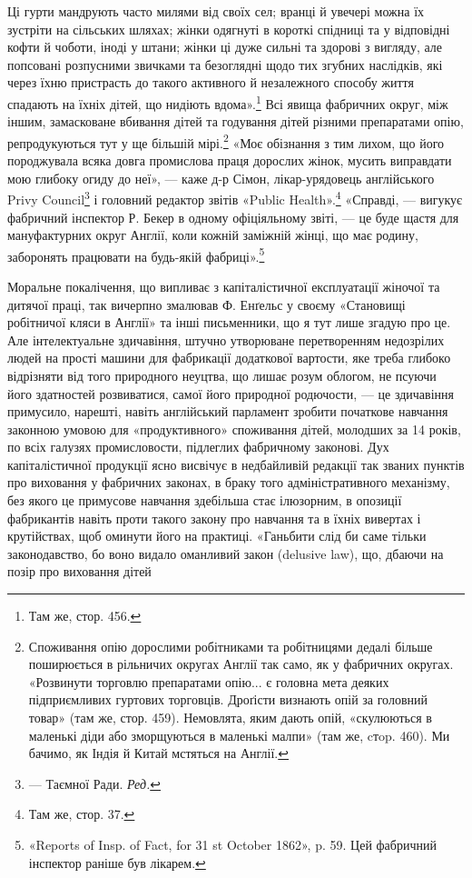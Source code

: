 \parcont{}  %
Ці гурти мандрують часто милями від своїх сел; вранці й увечері
можна їх зустріти на сільських шляхах; жінки одягнуті в короткі
спідниці та у відповідні кофти й чоботи, іноді у штани; жінки ці
дуже сильні та здорові з вигляду, але попсовані розпусними
звичками та безоглядні щодо тих згубних наслідків, які через
їхню пристрасть до такого активного й незалежного способу
життя спадають на їхніх дітей, що нидіють вдома».\footnote{
Там же, стор. 456.
} Всі явища
фабричних округ, між іншим, замасковане вбивання дітей та
годування дітей різними препаратами опію, репродукуються тут
у ще більшій мірі.\footnote{
Споживання опію дорослими робітниками та робітницями дедалі
більше поширюється в рільничих округах Англії так само, як у фабричних
округах. «Розвинути торговлю препаратами опію... є головна мета
деяких підприємливих гуртових торговців. Дроґісти визнають опій за
головний товар» (там же, стор. 459). Немовлята, яким дають опій, «скулюються
в маленькі діди або зморщуються в маленькі малпи» (там же,
cтop. 460). Ми бачимо, як Індія й Китай мстяться на Англії.
} «Моє обізнання з тим лихом, що його породжувала
всяка довга промислова праця дорослих жінок, мусить
виправдати мою глибоку огиду до неї», — каже д-р Сімон,
лікар-урядовець англійського Privy Council\footnote*{
— Таємної Ради. \emph{Ред.}
} і головний редактор
звітів «Public Health».\footnote{
Там же, стор. 37.
} «Справді, — вигукує фабричний
інспектор Р. Бекер в одному офіціяльному звіті, — це буде
щастя для мануфактурних округ Англії, коли кожній заміжній
жінці, що має родину, заборонять працювати на будь-якій
фабриці».\footnote{
«Reports of Insp. of Fact, for 31 st October 1862», p. 59. Цей фабричний
інспектор раніше був лікарем.
}

Моральне покалічення, що випливає з капіталістичної експлуатації
жіночої та дитячої праці, так вичерпно змалював Ф. Енґельс
у своєму «Становищі робітничої кляси в Англії» та інші письменники,
що я тут лише згадую про це. Але інтелектуальне здичавіння,
штучно утворюване перетворенням недозрілих людей на
прості машини для фабрикації додаткової вартости, яке треба
глибоко відрізняти від того природного неуцтва, що лишає розум
облогом, не псуючи його здатностей розвиватися, самої його природної
родючости, — це здичавіння примусило, нарешті, навіть
англійський парламент зробити початкове навчання законною
умовою для «продуктивного» споживання дітей, молодших за
14 років, по всіх галузях промисловости, підлеглих фабричному
законові. Дух капіталістичної продукції ясно висвічує в недбайливій
редакції так званих пунктів про виховання у фабричних
законах, в браку того адміністративного механізму, без якого це
примусове навчання здебільша стає ілюзорним, в опозиції фабрикантів
навіть проти такого закону про навчання та в їхніх вивертах
і крутійствах, щоб оминути його на практиці. «Ганьбити
слід би саме тільки законодавство, бо воно видало оманливий
закон (delusive law), що, дбаючи на позір про виховання дітей
\parbreak{}  %
